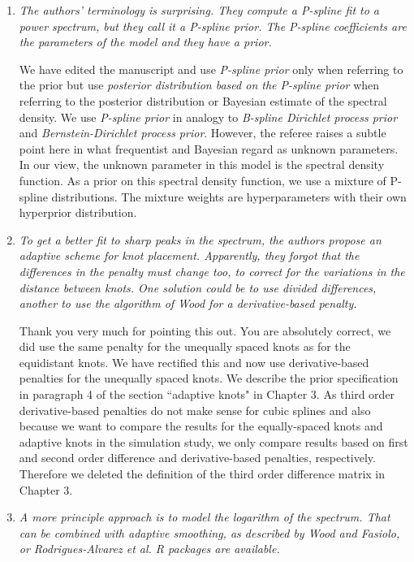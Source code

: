 \documentclass{scrartcl}
\newcommand{\refereeQuote}{\textit }
\newcommand{\response}{}
\begin{document}
\begin{enumerate}
\item
\refereeQuote{The authors' terminology is surprising. They compute a P-spline fit to a power spectrum, but they call it a P-spline prior. The P-spline coefficients are the parameters of the model and they have a prior.}\smallskip

\response{We have edited the manuscript and use {\em P-spline prior} only when referring to the prior but use {\em posterior distribution based on the P-spline prior} when referring to the posterior distribution or Bayesian estimate of the spectral density. We use {\em P-spline prior} in analogy to {\em B-spline Dirichlet process prior} and {\em Bernstein-Dirichlet process prior}.  However, the referee raises a subtle point here in what frequentist and Bayesian regard as unknown parameters. In our view, the unknown parameter in this model is the spectral density function. As a prior on this spectral density function, we use a mixture of P-spline distributions. The mixture weights are hyperparameters with their own hyperprior distribution.}\bigskip

\item
\refereeQuote{To get a better fit to sharp peaks in the spectrum, the authors propose an adaptive scheme for knot placement. Apparently, they forgot that the differences in the penalty must change too, to correct for the variations in the distance between knots. One solution could be to use divided differences, another to use the algorithm of Wood for a derivative-based penalty.}\smallskip

\response{Thank you very much for pointing this out. You are absolutely correct, we did use the same penalty for the unequally spaced knots as for the equidistant knots.
We have rectified this and now use derivative-based penalties for the unequally spaced knots. We describe the prior specification in paragraph 4  of the section  ``adaptive knots" in Chapter 3. As third order derivative-based penalties do not make sense for cubic splines and also because we want to compare the results for the equally-spaced knots and adaptive knots in the simulation study, we only compare results based on first and second order difference and derivative-based penalties, respectively. Therefore we deleted the definition of the third order difference matrix in Chapter 3. }\bigskip

\item
\refereeQuote{A more principle approach is to model the logarithm of the spectrum. That can be combined with adaptive smoothing, as described by Wood and Fasiolo, or Rodrigues-Alvarez et al. R packages are available.}\smallskip


\end{enumerate}
\end{document}
